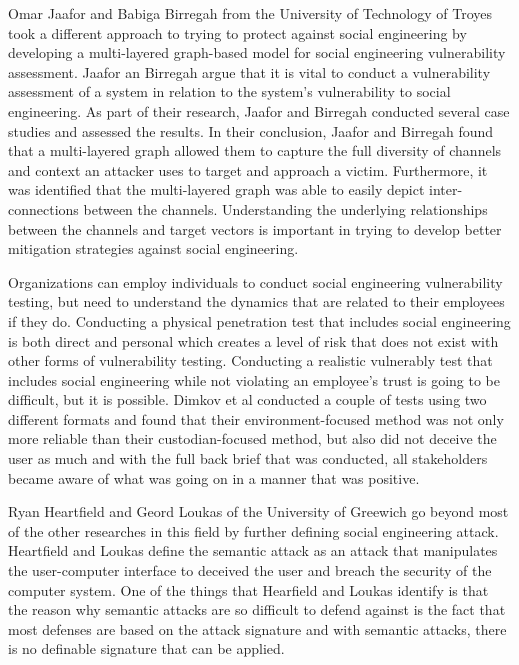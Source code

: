 \documentclass[conference]{IEEEtran}
\begin{document}
Omar Jaafor and Babiga Birregah from the University of Technology of Troyes took a different approach to trying to protect against social engineering by developing a multi-layered graph-based model for social engineering vulnerability assessment\cite{Jaafor:2015:MGM:2808797.2808899}.   Jaafor an Birregah argue that it is vital to conduct a vulnerability assessment of a system in relation to the system's vulnerability to social engineering. As part of their research, Jaafor and Birregah conducted several case studies and assessed the results.  In their conclusion, Jaafor and Birregah found that a multi-layered graph allowed them to capture the full diversity of channels and context an attacker uses to target and approach a victim\cite{Jaafor:2015:MGM:2808797.2808899}.  Furthermore, it was identified that the multi-layered graph was able to easily depict inter-connections between the channels\cite{Jaafor:2015:MGM:2808797.2808899}.  Understanding the underlying relationships between the channels and target vectors is important in trying to develop better mitigation strategies against social engineering. 

Organizations can employ individuals to conduct social engineering vulnerability testing, but need to understand the dynamics that are related to their employees if they do.  Conducting a physical penetration test that includes social engineering is both direct and personal which creates a level of risk that does not exist with other forms of vulnerability testing\cite{Dimkov:2010:TMP:1920261.1920319}.   Conducting a realistic vulnerably test that includes social engineering while not violating an employee's trust is going to be difficult, but it is possible. Dimkov et al conducted a couple of tests using two different formats and found that their environment-focused method was not only more reliable than their custodian-focused method, but also did not deceive the user as much and with the full back brief that was conducted, all stakeholders became aware of what was going on in a manner that was positive\cite{Dimkov:2010:TMP:1920261.1920319}.  

Ryan Heartfield and Geord Loukas of the University of Greewich go beyond most of the other researches in this field by further defining social engineering attack.  Heartfield and Loukas define the semantic attack as an attack that manipulates the user-computer interface to deceived the user and breach the security of the computer system\cite{Heartfield:2015:TAS:2856149.2835375}.   One of the things that Hearfield and Loukas identify is that the reason why semantic attacks are so difficult to defend against is the fact that most defenses are based on the attack signature and with semantic attacks, there is no definable signature that can be applied\cite{Heartfield:2015:TAS:2856149.2835375}. 
\end{document}
